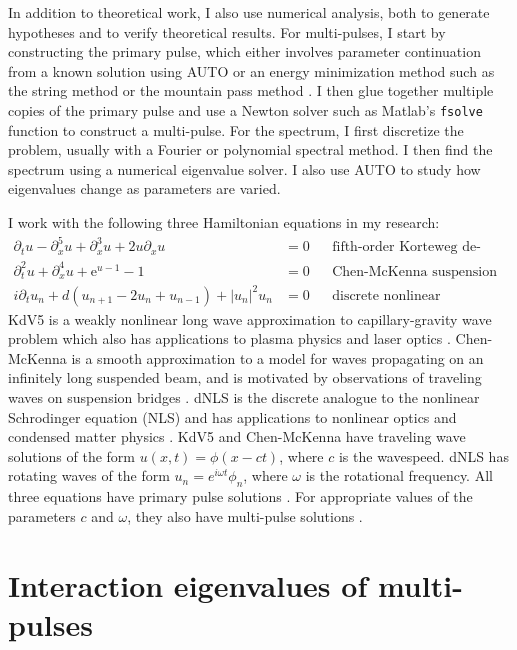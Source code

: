 \documentclass[12pt,reqno,oneside]{amsart}
\theoremstyle{definition}
\theoremstyle{remark}
\begin{document}
In addition to theoretical work, I also use numerical analysis, both to generate hypotheses and to verify theoretical results. For multi-pulses, I start by constructing the primary pulse, which either involves parameter continuation from a known solution using AUTO or an energy minimization method such as the string method \cite{Chamard2011} or the mountain pass method \cite{Chen1997}. I then glue together multiple copies of the primary pulse and use a Newton solver such as Matlab's \texttt{fsolve} function to construct a multi-pulse. For the spectrum, I first discretize the problem, usually with a Fourier or polynomial spectral method. I then find the spectrum using a numerical eigenvalue solver. I also use AUTO to study how eigenvalues change as parameters are varied.

I work with the following three Hamiltonian equations in my research:
\begin{align*}
\partial_t u - \partial_x^5 u + \partial_x^3 u + 2 u \partial_x u &= 0 && \text{fifth-order Korteweg de-Vries equation (KdV5)} \\
\partial_t^2 u + \partial_x^4 u + \mathrm{e}^{u-1} - 1 &= 0 &&\text{Chen-McKenna suspension bridge equation} \\
i\partial_t u_n + d(u_{n+1} - 2 u_n + u_{n-1}) + |u_n|^2 u_n &= 0 &&\text{discrete nonlinear Schrodinger equation (dNLS)}
\end{align*}
KdV5 is a weakly nonlinear long wave approximation to capillary-gravity wave problem which also has applications to plasma physics and laser optics \cite{Pelinovsky2007}. Chen-McKenna is a smooth approximation to a model for waves propagating on an infinitely long suspended beam, and is motivated by observations of traveling waves on suspension bridges \cite{McKenna1990,Chen1997}. dNLS is the discrete analogue to the nonlinear Schrodinger equation (NLS) and has applications to nonlinear optics and condensed matter physics \cite{Kevrekidis2009}. KdV5 and Chen-McKenna have traveling wave solutions of the form $u(x, t) = \phi(x - ct)$, where $c$ is the wavespeed. dNLS has rotating waves of the form $u_n = e^{i\omega t}\phi_n$, where $\omega$ is the rotational frequency.
All three equations have primary pulse solutions \cite{Pelinovsky2007,Smets2002,Berg2018,Kevrekidis2009}. For appropriate values of the parameters $c$ and $\omega$, they also have multi-pulse solutions \cite{Buffoni1996,SandstedeStrut,Kevrekidis2009}.

\section{Interaction eigenvalues of multi-pulses}
\end{document}
